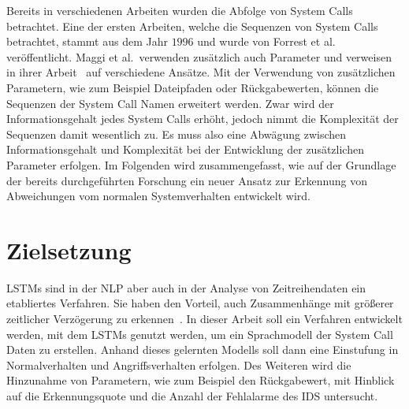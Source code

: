 Bereits in verschiedenen Arbeiten wurden die Abfolge von System Calls betrachtet.
Eine der ersten Arbeiten, welche die Sequenzen von System Calls betrachtet, stammt aus dem Jahr $1996$ und wurde von Forrest et al.~\cite{FORREST} veröffentlicht.
Maggi et al.\ verwenden zusätzlich auch Parameter und verweisen in ihrer Arbeit~\cite{MAGGI} auf verschiedene Ansätze.
Mit der Verwendung von zusätzlichen Parametern, wie zum Beispiel Dateipfaden oder Rückgabewerten, können die Sequenzen der System Call Namen erweitert werden.
Zwar wird der Informationsgehalt jedes System Calls erhöht, jedoch nimmt die Komplexität der Sequenzen damit wesentlich zu. 
Es muss also eine Abwägung zwischen Informationsgehalt und Komplexität bei der Entwicklung der zusätzlichen Parameter erfolgen.
Im Folgenden wird zusammengefasst, wie auf der Grundlage der bereits durchgeführten Forschung ein neuer Ansatz zur Erkennung von Abweichungen vom normalen Systemverhalten entwickelt wird.





\section{Zielsetzung}\label{sec:Forschungsfrage}

\acfp{LSTM} sind in der \ac{NLP} aber auch in der Analyse von Zeitreihendaten ein etabliertes Verfahren.
Sie haben den Vorteil, auch Zusammenhänge mit größerer zeitlicher Verzögerung zu erkennen~\cite{HOCHREITER}.
In dieser Arbeit soll ein Verfahren entwickelt werden, mit dem \acp{LSTM} genutzt werden, um ein Sprachmodell der System Call Daten zu erstellen.
Anhand dieses gelernten Modells soll dann eine Einstufung in Normalverhalten und Angriffsverhalten erfolgen.
Des Weiteren wird die Hinzunahme von Parametern, wie zum Beispiel den Rückgabewert, mit Hinblick auf die Erkennungsquote und die Anzahl der Fehlalarme des \acf{IDS} untersucht.

